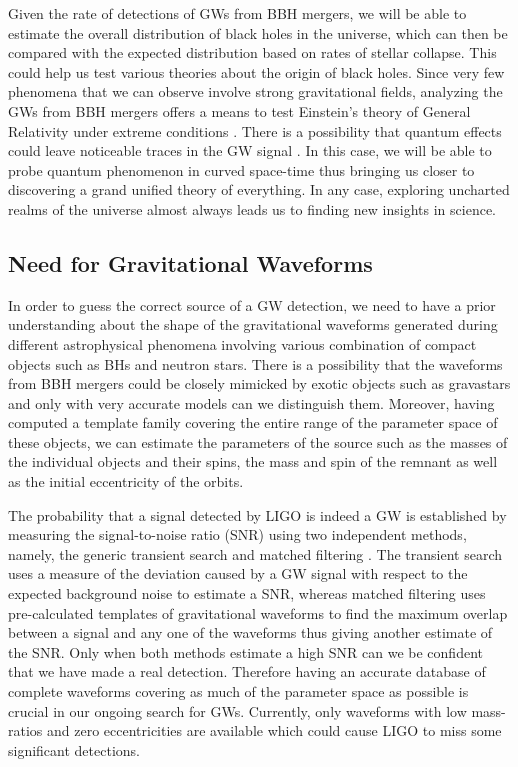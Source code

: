 \documentclass[aps,twocolumn,secnumarabic,nobalancelastpage,amsmath,amssymb,
nofootinbib]{revtex4}
\begin{document}
	Given the rate of detections of GWs from BBH mergers, we will be able to estimate the overall distribution of black holes in the universe, which can then be compared with the expected distribution based on rates of stellar collapse. This could help us test various theories about the origin of black holes. Since very few phenomena that we can observe involve strong gravitational fields, analyzing the GWs from BBH mergers offers a means to test Einstein's theory of General Relativity under extreme conditions \cite{test}. There is a possibility that quantum effects could leave noticeable traces in the GW signal \cite{quantum}. In this case, we will be able to probe quantum phenomenon in curved space-time thus bringing us closer to discovering a grand unified theory of everything. In any case, exploring uncharted realms of the universe almost always leads us to finding new insights in science.
		
	\subsection{Need for Gravitational Waveforms}
		
	In order to guess the correct source of a GW detection, we need to have a prior understanding about the shape of the gravitational waveforms generated during different astrophysical phenomena involving various combination of compact objects such as BHs and neutron stars. There is a possibility that the waveforms from BBH mergers could be closely mimicked by exotic objects such as gravastars \cite{mimick} and only with very accurate models can we distinguish them. Moreover, having computed a template family covering the entire range of the parameter space of these objects, we can estimate the parameters of the source such as the masses of the individual objects and their spins, the mass and spin of the remnant as well as the initial eccentricity of the orbits.
		\newline
	
	The probability that a signal detected by LIGO is indeed a GW is established by measuring the signal-to-noise ratio (SNR) using two independent methods, namely, the generic transient search and matched filtering \cite{gw1}. The transient search uses a measure of the deviation caused by a GW signal with respect to the expected background noise to estimate a SNR, whereas matched filtering uses pre-calculated templates of gravitational waveforms to find the maximum overlap between a signal and any one of the waveforms thus giving another estimate of the SNR. Only when both methods estimate a high SNR can we be confident that we have made a real detection. Therefore having an accurate database of complete waveforms covering as much of the parameter space as possible is crucial in our ongoing search for GWs. Currently, only waveforms with low mass-ratios and zero eccentricities are available which could cause LIGO to miss some significant detections.
	
\end{document}
